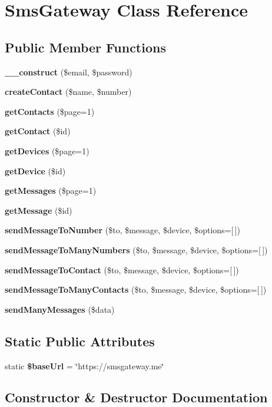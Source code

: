 \section{Sms\+Gateway Class Reference}
\label{class_sms_gateway}
\subsection*{Public Member Functions}
\begin{DoxyCompactItemize}
\item 
{\bf \+\_\+\+\_\+construct} (\$email, \$password)
\item 
{\bf create\+Contact} (\$name, \$number)
\item 
{\bf get\+Contacts} (\$page=1)
\item 
{\bf get\+Contact} (\$id)
\item 
{\bf get\+Devices} (\$page=1)
\item 
{\bf get\+Device} (\$id)
\item 
{\bf get\+Messages} (\$page=1)
\item 
{\bf get\+Message} (\$id)
\item 
{\bf send\+Message\+To\+Number} (\$to, \$message, \$device, \$options=[$\,$])
\item 
{\bf send\+Message\+To\+Many\+Numbers} (\$to, \$message, \$device, \$options=[$\,$])
\item 
{\bf send\+Message\+To\+Contact} (\$to, \$message, \$device, \$options=[$\,$])
\item 
{\bf send\+Message\+To\+Many\+Contacts} (\$to, \$message, \$device, \$options=[$\,$])
\item 
{\bf send\+Many\+Messages} (\$data)
\end{DoxyCompactItemize}
\subsection*{Static Public Attributes}
\begin{DoxyCompactItemize}
\item 
static {\bf \$base\+Url} = \char`\"{}https\+://smsgateway.\+me\char`\"{}
\end{DoxyCompactItemize}


\subsection{Constructor \& Destructor Documentation}

